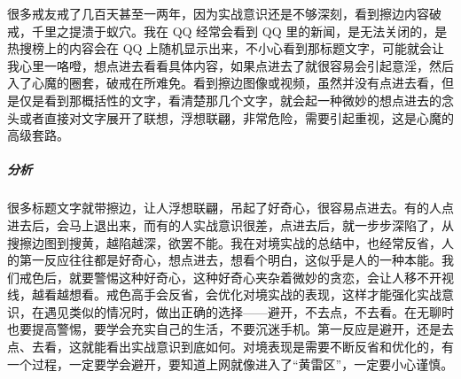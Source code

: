 \begin{case}
    很多戒友戒了几百天甚至一两年，因为实战意识还是不够深刻，看到擦边内容破戒，千里之提溃于蚁穴。我在 QQ 经常会看到 QQ 里的新闻，是无法关闭的，是热搜榜上的内容会在 QQ 上随机显示出来，不小心看到那标题文字，可能就会让我心里一咯噔，想点进去看看具体内容，如果点进去了就很容易会引起意淫，然后入了心魔的圈套，破戒在所难免。看到擦边图像或视频，虽然并没有点进去看，但是仅是看到那概括性的文字，看清楚那几个文字，就会起一种微妙的想点进去的念头或者直接对文字展开了联想，浮想联翩，非常危险，需要引起重视，这是心魔的高级套路。
    \subparagraph{分析} 很多标题文字就带擦边，让人浮想联翩，吊起了好奇心，很容易点进去。有的人点进去后，会马上退出来，而有的人实战意识很差，点进去后，就一步步深陷了，从搜擦边图到搜黄，越陷越深，欲罢不能。我在对境实战的总结中，也经常反省，人的第一反应往往都是好奇心，想点进去，想看个明白，这似乎是人的一种本能。我们戒色后，就要警惕这种好奇心，这种好奇心夹杂着微妙的贪恋，会让人移不开视线，越看越想看。戒色高手会反省，会优化对境实战的表现，这样才能强化实战意识，在遇见类似的情况时，做出正确的选择——避开，不去点，不去看。在无聊时也要提高警惕，要学会充实自己的生活，不要沉迷手机。第一反应是避开，还是去点、去看，这就能看出实战意识到底如何。对境表现是需要不断反省和优化的，有一个过程，一定要学会避开，要知道上网就像进入了“黄雷区”，一定要小心谨慎。
\end{case}

